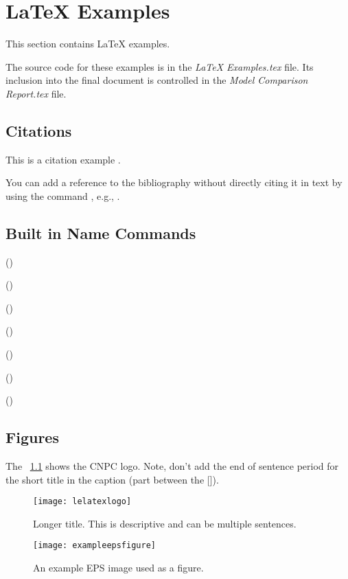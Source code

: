\chapter{\LaTeX{} Examples}
This section contains \LaTeX{} examples.  

The source code for these examples is in the \textit{LaTeX Examples.tex} file.  Its inclusion into the final document is controlled in the \textit{Model Comparison Report.tex} file.

\section{Citations}
This is a citation example .
~\cite{ref:aarsnes2017a}

You can add a reference to the bibliography without directly citing it in text by using the command , e.g., .

\section{Built in Name Commands}
\begin{bulletedlist}
	\item \appendixname{} ()
	\item \chaptername{} ()
	\item \equationname{} ()
	\item \figurename{} ()
	\item {} ()
	\item \sectionname{} ()
	\item \tablename{} ()
\end{bulletedlist}

\section{Figures}
The \figurename~\ref{fig:lelatexlogo} shows the CNPC logo.  Note, don't add the end of sentence period for the short title in the caption (part between the []).
\begin{figure}
	\centering
	\texttt{[image: lelatexlogo]}
	\caption[Short title for list of figures]{Longer title.  This is descriptive and can be multiple sentences.}
	\label{fig:lelatexlogo}
\end{figure}
\begin{figure}
	\centering
	\texttt{[image: exampleepsfigure]}
	\caption[EPS example]{An example EPS image used as a figure.}
	\label{fig:exampleepsfigure}
\end{figure}

